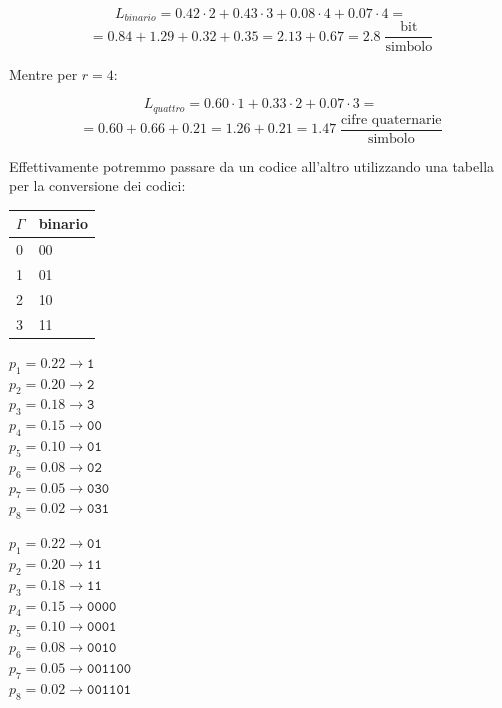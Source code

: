 \begin{equation*}
L_{binario} = 0.42 \cdot 2 + 0.43 \cdot 3 + 0.08 \cdot 4 + 0.07 \cdot 4 =
\end{equation*}
\begin{equation*}
= 0.84 + 1.29 + 0.32 + 0.35 = 2.13 + 0.67 = 2.8\; \frac{\text{bit}}{\text{simbolo}}
\end{equation*}

Mentre per $r=4$:

\begin{equation*}
L_{quattro} = 0.60 \cdot 1 + 0.33 \cdot 2 + 0.07 \cdot 3  =
\end{equation*}
\begin{equation*}
= 0.60 + 0.66 + 0.21 = 1.26 + 0.21 = 1.47\; \frac{\text{cifre quaternarie}}{\text{simbolo}}
\end{equation*}

Effettivamente potremmo passare da un codice all'altro utilizzando una tabella per la conversione dei codici:
\begin{table}[h]
	\centering
	\begin{tabular}{l|l}
		$\Gamma$ & binario \\
		\hline
		0        & 00      \\
		1        & 01      \\
		2        & 10      \\
		3        & 11     
	\end{tabular}
\end{table}

\begin{multicols}{2}
	\begin{center}
		$p_1=0.22 \rightarrow \texttt{1}$\\
		$p_2=0.20 \rightarrow \texttt{2}$\\
		$p_3=0.18 \rightarrow \texttt{3}$\\
		$p_4=0.15 \rightarrow \texttt{00}$\\
		$p_5=0.10 \rightarrow \texttt{01}$\\
		$p_6=0.08 \rightarrow \texttt{02}$\\
		$p_7=0.05 \rightarrow \texttt{030}$\\
		$p_8=0.02 \rightarrow \texttt{031}$\\
	\end{center}

\columnbreak

\begin{center}
	$p_1=0.22 \rightarrow \texttt{01}$\\
	$p_2=0.20 \rightarrow \texttt{11}$\\
	$p_3=0.18 \rightarrow \texttt{11}$\\
	$p_4=0.15 \rightarrow \texttt{0000}$\\
	$p_5=0.10 \rightarrow \texttt{0001}$\\
	$p_6=0.08 \rightarrow \texttt{0010}$\\
	$p_7=0.05 \rightarrow \texttt{001100}$\\
	$p_8=0.02 \rightarrow \texttt{001101}$\\
\end{center}
\end{multicols}

